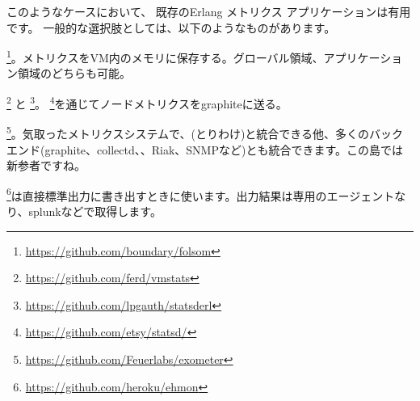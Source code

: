 このようなケースにおいて、 既存のErlang メトリクス アプリケーションは有用です。
一般的な選択肢としては、以下のようなものがあります。

\begin{itemize*}
	\item {}\footnote{\href{https://github.com/boundary/folsom}{https://github.com/boundary/folsom}}。メトリクスをVM内のメモリに保存する。グローバル領域、アプリケーション領域のどちらも可能。
  \item {}\footnote{\href{https://github.com/ferd/vmstats}{https://github.com/ferd/vmstats}} と \footnote{\href{https://github.com/lpgauth/statsderl}{https://github.com/lpgauth/statsderl}}。 \footnote{\href{https://github.com/etsy/statsd/}{https://github.com/etsy/statsd/}}を通じてノードメトリクスをgraphiteに送る。
  \item {}\footnote{\href{https://github.com/Feuerlabs/exometer}{https://github.com/Feuerlabs/exometer}}。気取ったメトリクスシステムで、(とりわけ)と統合できる他、多くのバックエンド(graphite、collectd、、Riak、SNMPなど)とも統合できます。この島では新参者ですね。
	\item {}\footnote{\href{https://github.com/heroku/ehmon}{https://github.com/heroku/ehmon}}は直接標準出力に書き出すときに使います。出力結果は専用のエージェントなり、splunkなどで取得します。

\end{itemize*}
